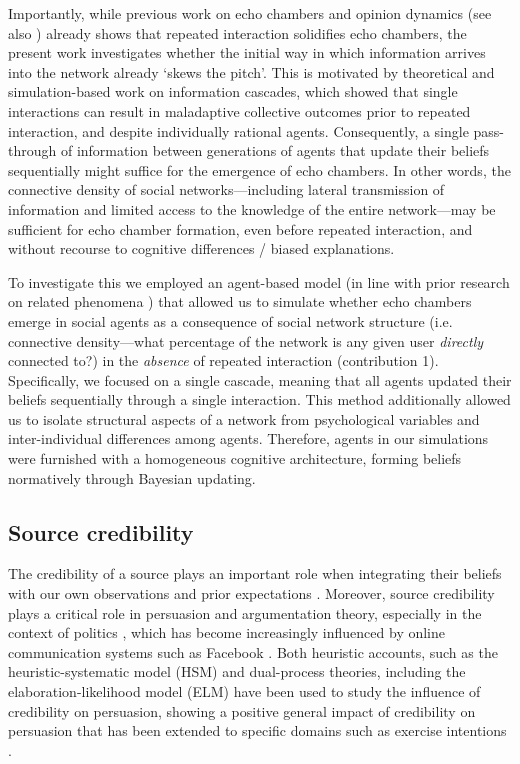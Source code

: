 \documentclass[fleqn,10pt]{wlscirep}
\begin{document}
Importantly, while previous work on echo chambers \cite{madsen2018large, madsen2017growing} and opinion dynamics (see also \cite{lorenz2007continuous}) already shows that repeated interaction solidifies echo chambers, the present work investigates whether the initial way in which information arrives into the network already `skews the pitch'. This is motivated by theoretical  \cite{bikhchandani1992theory} and simulation-based \cite{pilditch2017opinion} work on information cascades, which showed that single interactions can result in maladaptive collective outcomes prior to repeated interaction, and despite individually rational agents. Consequently, a single pass-through of information between generations of agents that update their beliefs sequentially might suffice for the emergence of echo chambers. In other words, the connective density of social networks---including lateral transmission of information and limited access to the knowledge of the entire network---may be sufficient for echo chamber formation, even before repeated interaction, and without recourse to cognitive differences / biased explanations. 

To investigate this we employed an agent-based model (in line with prior research on related phenomena \cite{madsen2017growing, madsen2018large}) that allowed us to simulate whether echo chambers emerge in social agents as a consequence of social network structure (i.e. connective density---what percentage of the network is any given user \textit{directly} connected to?) in the \emph{absence} of repeated interaction (contribution 1). Specifically, we focused on a single cascade, meaning that all agents updated their beliefs sequentially through a single interaction. This method additionally allowed us to isolate structural aspects of a network from psychological variables and inter-individual differences among agents. Therefore, agents in our simulations were furnished with a homogeneous cognitive architecture, forming beliefs normatively through Bayesian updating. 

\subsection*{Source credibility}
The credibility of a source plays an important role when integrating their beliefs with our own observations and prior expectations \cite{cuddy2011dynamics, fiske2007universal}. Moreover, source credibility plays a critical role in persuasion and argumentation theory, especially in the context of politics \cite{housholder2014facebook, robinson1999measures, cialdini1993influence}, which has become increasingly influenced by online communication systems such as Facebook \cite{bail2016combining}. Both heuristic accounts, such as the heuristic-systematic model (HSM) \cite{chaiken1999heuristic} and dual-process theories, including the elaboration-likelihood model (ELM) \cite{petty1986elaboration} have been used to study the influence of credibility on persuasion, showing a positive general impact of credibility on persuasion \cite{chaiken1994heuristic} that has been extended to specific domains such as exercise intentions \cite{jones2003effects}. 
\end{document}
